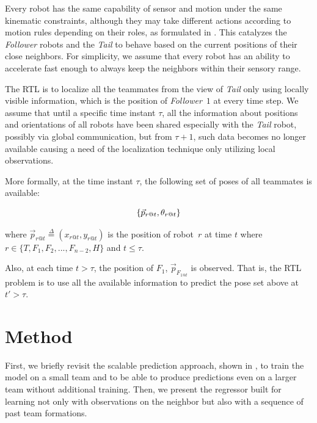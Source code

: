 \documentclass[letterpaper, 10 pt, conference]{ieeeconf}  %
\begin{document}
	Every robot has the same capability of sensor and motion under the same 
	kinematic constraints, although they may take different actions according to 
	motion rules depending on their roles, as formulated in \cite{CPR17}. This catalyzes the
	 \emph{Follower} robots and the \emph{Tail} to behave based on the current positions of their close neighbors. For simplicity, we assume that every robot 
	 has an ability to accelerate fast enough to always keep the neighbors within their 
	 sensory range.
	
	The RTL is to localize all the teammates from the view of 
	\emph{Tail} only using locally visible information, which is the position of 
	\emph{Follower}~$1$ at every time step. 	
	We assume that until a specific time instant 
	$\tau$, all the information about positions and orientations of all robots 
	have been shared especially with the \emph{Tail} robot, 
	possibly via global communication,
	but from $\tau+1$, such data becomes no longer available causing a need of the
	localization technique only utilizing local observations.	
	
	More formally, at the time instant $\tau$, the following set of poses of all teammates is 
	available: 

	\begin{equation*}
		\{\vec{p}_{r@t},\theta_{r@t}\} \\	
	\label{eq:pose_set}
	\end{equation*}	
	
	where $\vec{p}_{r@t} \overset{\Delta}{=}(x_{r@t}, y_{r@t})$ is the position of robot~$r$
	at time $t$ 
	where  $r \in \{T, F_{1}, F_{2}, ..., F_{n-2}, H\}$ and $t \leq \tau$. 
	
	Also, at each time $t > \tau$, the position of $F_1$, $\vec{p}_{F_{1@t}}$ is observed.  
	That is, the RTL problem is to use all the available information to predict 
	the pose set above at $t' > \tau$. 
	
	
	
	\section{Method}
	\label{sec:method}
	
	First, we briefly revisit the scalable prediction approach, shown in \cite{CPR17}, 
	to train the model on a small team and to be able to produce predictions 
	even on a larger team without additional training. 
	Then, we present the regressor built for learning not only with observations on 
	the neighbor but also with a sequence of past team formations.
\end{document}
